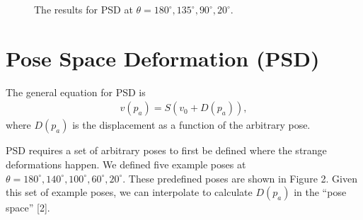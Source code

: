 \documentclass[10pt,twocolumn,letterpaper]{article}
\begin{document}
\begin{figure}
\begin{center}
\end{center}
   \caption{The results for PSD at $\theta = 180^{\circ}, 135^{\circ}, 90^{\circ}, 20^{\circ}$.}
\label{fig:short}
\end{figure}

\section{Pose Space Deformation (PSD)}

The general equation for PSD is
\begin{align} v(p_a) = S(v_0 + D(p_a)), \end{align}
where $D(p_a)$ is the displacement as a function of the arbitrary pose.

PSD requires a set of arbitrary poses to first be defined where the strange deformations happen. We defined five example poses at $\theta = 180^{\circ}, 140^{\circ}, 100^{\circ}, 60^{\circ}, 20^{\circ}$. These predefined poses are shown in Figure 2. Given this set of example poses, we can interpolate to calculate $D(p_a)$ in the ``pose space'' [2]. 
\end{document}
